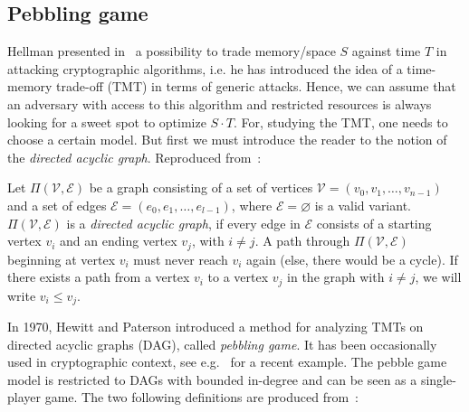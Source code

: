 \subsection{Pebbling game}
Hellman presented in~\cite{Hellman:2006:CTT:2263346.2269686} a possibility to trade memory/space $S$ against time $T$ in attacking cryptographic algorithms, i.e. he has introduced the idea of a time-memory trade-off (TMT) in terms of generic attacks. Hence, we can assume that an adversary with access to this algorithm and restricted resources is always looking for a sweet spot to optimize $S \cdot T$. For, studying the TMT, one needs to choose a certain model. But first we must introduce the reader to the notion of the \emph{directed acyclic graph}. Reproduced from~\cite{ForlerLW13}:

\begin{definition}
  Let $\Pi(\mathcal{V},\mathcal{E})$ be a graph consisting of a set of vertices $\mathcal{V}=(v_0,v_1,\dots,v_{n-1})$ and a set of edges $\mathcal{E}=(e_0,e_1,\dots,e_{l-1})$, where $\mathcal{E}=\varnothing$ is a valid variant. $\Pi(\mathcal{V},\mathcal{E})$ is a \emph{directed acyclic graph}, if every edge in $\mathcal{E}$
  consists of a starting vertex $v_i$ and an ending vertex $v_j$, with $i \neq j$. A path through $\Pi(\mathcal{V},\mathcal{E})$ beginning at vertex $v_i$ must never reach $v_i$ again (else, there would be a cycle). If there exists a path from a vertex $v_i$ to a vertex $v_j$ in the graph with $i \neq j$, we will write $v_i \leq v_j$.
\end{definition}

In 1970, Hewitt and Paterson introduced a method for analyzing TMTs on directed acyclic graphs (DAG), called \emph{pebbling game}. It has been occasionally used in cryptographic context, see e.g.~\cite{Dziembowski:2011:KSR:2033036.2033061} for a recent example. The pebble game model is restricted to DAGs with bounded in-degree and can be seen as a single-player game. The two following definitions are produced from~\cite{cryptoeprint:2016:875}:

